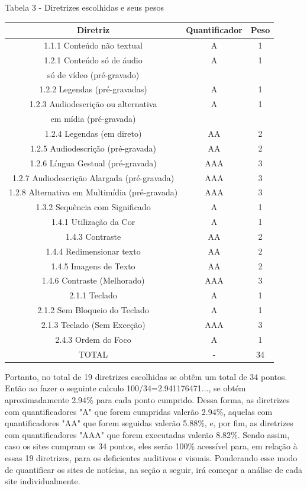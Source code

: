 \documentclass[a4paper]{article}
\begin{document}
\begin{titlepage}
Tabela 3 - Diretrizes escolhidas e seus pesos\\[-1cm]
\begin{center}
	\fontsize{8pt}{8pt}\selectfont
	\begin{longtable}{|c|c|c|}
		\hline
		Diretriz & Quantificador & Peso\\
		\hline
		1.1.1 Conteúdo não textual & A & 1\\
		\hline
		1.2.1 Conteúdo só de áudio & A & 1\\
		só de vídeo (pré-gravado) & & \\
		\hline
		1.2.2 Legendas (pré-gravadas) & A & 1\\
		\hline
		1.2.3 Audiodescrição ou alternativa & A & 1\\
		em mídia (pré-gravada) & & \\
		\hline
		1.2.4 Legendas (em direto) & AA & 2\\
		\hline
		1.2.5 Audiodescrição (pré-gravada) & AA & 2\\
		\hline
		1.2.6 Língua Gestual (pré-gravada) & AAA & 3\\
		\hline
		1.2.7 Audiodescrição Alargada (pré-gravada) & AAA & 3\\
		\hline
		1.2.8 Alternativa em Multimídia (pré-gravada) & AAA & 3\\
		\hline
		1.3.2 Sequência com Significado & A & 1\\
		\hline
		1.4.1 Utilização da Cor & A & 1\\
		\hline
		1.4.3 Contraste & AA & 2\\
		\hline
		1.4.4 Redimensionar texto & AA & 2\\
		\hline
		1.4.5 Imagens de Texto & AA & 2\\
		\hline
		1.4.6 Contraste (Melhorado) & AAA & 3\\
		\hline
		2.1.1 Teclado & A & 1\\
		\hline
		2.1.2 Sem Bloqueio do Teclado & A & 1\\
		\hline
		2.1.3 Teclado (Sem Exceção) & AAA & 3\\
		\hline
		2.4.3 Ordem do Foco & A & 1\\
		\hline
		TOTAL & - & 34\\
		\hline
	\end{longtable}
\end{center}

Portanto, no total de 19 diretrizes escolhidas se obtêm um total de 34 pontos. Então ao fazer o seguinte calculo 100/34=2.941176471..., se obtém aproximadamente 2.94\% para cada ponto cumprido. Dessa forma, as diretrizes com quantificadores "A" que forem cumpridas valerão 2.94\%, aquelas com quantificadores "AA" que forem seguidas valerão 5.88\%, e, por fim, as diretrizes com quantificadores "AAA" que forem executadas valerão 8.82\%. Sendo assim, caso os sites cumpram os 34 pontos, eles serão 100\% acessível para, em relação à essas 19 diretrizes, para os deficientes auditivos e visuais. Ponderando esse modo de quantificar os sites de notícias, na seção a seguir, irá começar a análise de cada site individualmente.


\end{titlepage}
\end{document}

